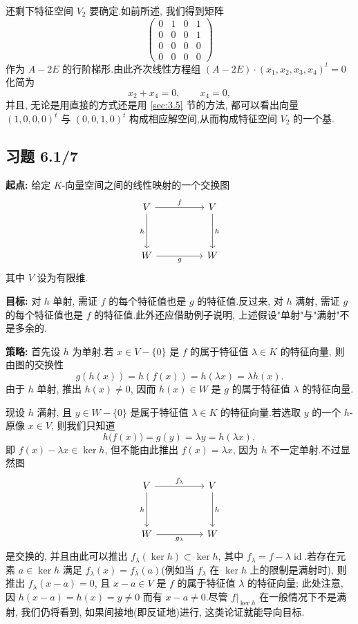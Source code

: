 还剩下特征空间 $V_2$ 要确定.如前所述, 我们得到矩阵
\[
\begin{pmatrix}
0 & 1 & 0 & 1 \\
0 & 0 & 0 & 1 \\
0 & 0 & 0 & 0 \\
0 & 0 & 0 & 0
\end{pmatrix}
\]
作为 $A - 2E$ 的行阶梯形.由此齐次线性方程组
$(A - 2E) \cdot (x_1, x_2, x_3, x_4)^t = 0$ 化简为
\[
x_2 + x_4 = 0, \qquad x_4 = 0,
\]
并且, 无论是用直接的方式还是用 \ref{sec:3.5} 节的方法, 都可以看出向量 $(1, 0, 0, 0)^t$ 与 $(0, 0, 1, 0)^t$ 构成相应解空间,从而构成特征空间 $V_2$ 的一个基.

\subsection*{习题 6.1/7}

\noindent\textbf{起点:} 给定 $K$-向量空间之间的线性映射的一个交换图
\[
\begin{tikzcd}[row sep=huge, column sep=huge]
V \arrow[r, "f"] \arrow[d, "h"'] & V \arrow[d, "h"] \\
W \arrow[r, "g"'] & W
\end{tikzcd}
\]
其中 $V$ 设为有限维.

\noindent\textbf{目标:} 对 $h$ 单射, 需证 $f$ 的每个特征值也是 $g$ 的特征值.反过来, 对 $h$ 满射,
需证 $g$ 的每个特征值也是 $f$ 的特征值.此外还应借助例子说明, 上述假设"单射"与"满射"不是多余的.

\noindent\textbf{策略:} 首先设 $h$ 为单射.若 $x \in V - \{0\}$ 是 $f$ 的属于特征值 $\lambda \in K$ 的特征向量, 则由图的交换性
\[
g(h(x)) = h(f(x)) = h(\lambda x) = \lambda h(x)\text{.}
\]
由于 $h$ 单射, 推出 $h(x) \neq 0$, 因而 $h(x) \in W$ 是 $g$ 的属于特征值 $\lambda$ 的特征向量.

现设 $h$ 满射, 且 $y \in W - \{0\}$ 是属于特征值 $\lambda \in K$ 的特征向量.若选取 $y$ 的一个 $h$-原像 $x \in V$, 则我们只知道
\[
h\bigl(f(x)\bigr) = g(y) = \lambda y = h(\lambda x),
\]
即 $f(x) - \lambda x \in \ker h$, 但不能由此推出 $f(x) = \lambda x$, 因为 $h$ 不一定单射.不过显然图
\[
\begin{tikzcd}[row sep=huge, column sep=huge]
V \arrow[r, "f_\lambda"] \arrow[d, "h"'] & V \arrow[d, "h"] \\
W \arrow[r, "g_\lambda"'] & W
\end{tikzcd}
\]
是交换的, 并且由此可以推出 $f_\lambda(\ker h) \subset \ker h$, 其中 $f_\lambda = f - \lambda \operatorname{id}$.若存在元素 $a \in \ker h$ 满足 $f_\lambda(x) = f_\lambda(a)$(例如当 $f_\lambda$ 在 $\ker h$ 上的限制是满射时), 则推出 $f_\lambda(x - a) = 0$, 且 $x - a \in V$ 是 $f$ 的属于特征值 $\lambda$ 的特征向量; 此处注意, 因 $h(x - a) = h(x) = y \neq 0$ 而有 $x - a \neq 0$.尽管 $f|_{\ker h}$ 在一般情况下不是满射, 我们仍将看到, 如果间接地(即反证地)进行, 这类论证就能导向目标.

